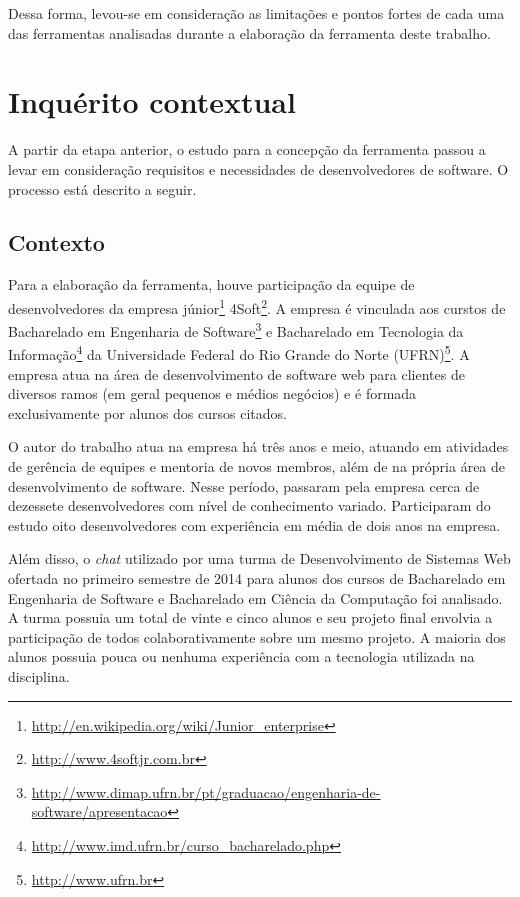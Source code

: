 \bigskip

Dessa forma, levou-se em consideração as limitações e pontos fortes de cada uma das ferramentas analisadas durante a elaboração da ferramenta deste trabalho.

\section{Inquérito contextual}

A partir da etapa anterior, o estudo para a concepção da ferramenta passou a levar em consideração requisitos e necessidades de desenvolvedores de software. O processo está descrito a seguir.

\subsection{Contexto}

Para a elaboração da ferramenta, houve participação da equipe de desenvolvedores da empresa júnior\footnote{\url{http://en.wikipedia.org/wiki/Junior_enterprise}} 4Soft\footnote{\url{http://www.4softjr.com.br}}. A empresa é vinculada aos curstos de Bacharelado em Engenharia de Software\footnote{\url{http://www.dimap.ufrn.br/pt/graduacao/engenharia-de-software/apresentacao}} e Bacharelado em Tecnologia da Informação\footnote{\url{http://www.imd.ufrn.br/curso_bacharelado.php}} da Universidade Federal do Rio Grande do Norte (UFRN)\footnote{\url{http://www.ufrn.br}}. A empresa atua na área de desenvolvimento de software web para clientes de diversos ramos (em geral pequenos e médios negócios) e é formada exclusivamente por alunos dos cursos citados.

O autor do trabalho atua na empresa há três anos e meio, atuando em atividades de gerência de equipes e mentoria de novos membros, além de na própria área de desenvolvimento de software. Nesse período, passaram pela empresa cerca de dezessete desenvolvedores com nível de conhecimento variado. Participaram do estudo oito desenvolvedores com experiência em média de dois anos na empresa.

Além disso, o \textit{chat} utilizado por uma turma de Desenvolvimento de Sistemas Web ofertada no primeiro semestre de 2014 para alunos dos cursos de Bacharelado em Engenharia de Software e Bacharelado em Ciência da Computação foi analisado. A turma possuia um total de vinte e cinco alunos e seu projeto final envolvia a participação de todos colaborativamente sobre um mesmo projeto. A maioria dos alunos possuia pouca ou nenhuma experiência com a tecnologia utilizada na disciplina.

